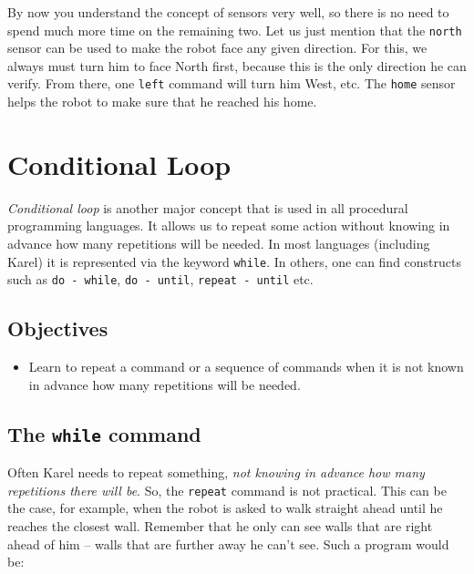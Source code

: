 By now you understand the concept of sensors very well, so there is no need to 
spend much more time on the remaining two. Let us just mention that the {\tt north} 
sensor can be used to make the robot face any given direction. For this,
we always must turn him to face North first, because this is the only 
direction he can verify. From there, one {\tt left} command will turn him 
West, etc. The {\tt home} sensor helps the robot to make sure that he reached his home. 




\section{Conditional Loop} \label{sec:whilek}

{\em Conditional loop} is another major concept that is used in all procedural 
programming languages. It allows us to repeat some action without knowing 
in advance how many repetitions will be needed. In most languages (including Karel) 
it is represented via the keyword {\tt while}. In others, one can find 
constructs such as {\tt do - while}, {\tt do - until},
{\tt repeat - until} etc.

\subsection{Objectives} 
 
\begin{itemize}
\item Learn to repeat a command or a sequence of commands when it is not known 
      in advance how many repetitions will be needed.
\end{itemize}

\subsection{The {\tt while} command}

Often Karel needs to repeat something, {\em not knowing in advance how many repetitions
there will be}. So, the {\tt repeat} command is not practical. This can be the case, for example, 
when the robot is asked to walk straight ahead until he reaches the closest wall.
Remember that he only can see walls that are right ahead of him -- walls 
that are further away he can't see. Such a program would be:\\

